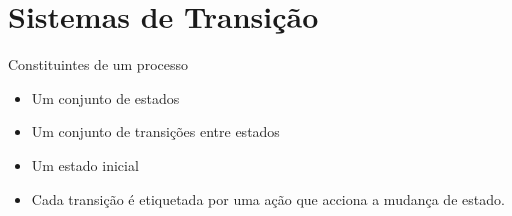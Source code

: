 \documentclass[aspectratio=169]{beamer}
\begin{document}


\section{Sistemas de Transição}

\begin{frame}{Constituintes de um processo}
\begin{itemize}
  \item Um conjunto de estados
\item Um conjunto de transições entre estados
\item Um estado inicial
\item Cada transição é etiquetada por uma ação que  acciona a mudança de estado.
\end{itemize}
  
\end{frame}
\end{document}
